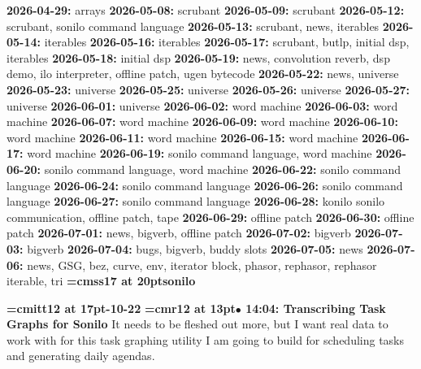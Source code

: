 {\noindent \bf 2026-04-29:} arrays\smallskip
{\noindent \bf 2026-05-08:} scrubant\smallskip
{\noindent \bf 2026-05-09:} scrubant\smallskip
{\noindent \bf 2026-05-12:} scrubant, sonilo command language\smallskip
{\noindent \bf 2026-05-13:} scrubant, news, iterables\smallskip
{\noindent \bf 2026-05-14:} iterables\smallskip
{\noindent \bf 2026-05-16:} iterables\smallskip
{\noindent \bf 2026-05-17:} scrubant, butlp, initial dsp, iterables\smallskip
{\noindent \bf 2026-05-18:} initial dsp\smallskip
{\noindent \bf 2026-05-19:} news, convolution reverb, dsp demo, ilo interpreter, offline patch, ugen bytecode\smallskip
{\noindent \bf 2026-05-22:} news, universe\smallskip
{\noindent \bf 2026-05-23:} universe\smallskip
{\noindent \bf 2026-05-25:} universe\smallskip
{\noindent \bf 2026-05-26:} universe\smallskip
{\noindent \bf 2026-05-27:} universe\smallskip
{\noindent \bf 2026-06-01:} universe\smallskip
{\noindent \bf 2026-06-02:} word machine\smallskip
{\noindent \bf 2026-06-03:} word machine\smallskip
{\noindent \bf 2026-06-07:} word machine\smallskip
{\noindent \bf 2026-06-09:} word machine\smallskip
{\noindent \bf 2026-06-10:} word machine\smallskip
{\noindent \bf 2026-06-11:} word machine\smallskip
{\noindent \bf 2026-06-15:} word machine\smallskip
{\noindent \bf 2026-06-17:} word machine\smallskip
{\noindent \bf 2026-06-19:} sonilo command language, word machine\smallskip
{\noindent \bf 2026-06-20:} sonilo command language, word machine\smallskip
{\noindent \bf 2026-06-22:} sonilo command language\smallskip
{\noindent \bf 2026-06-24:} sonilo command language\smallskip
{\noindent \bf 2026-06-26:} sonilo command language\smallskip
{\noindent \bf 2026-06-27:} sonilo command language\smallskip
{\noindent \bf 2026-06-28:} konilo sonilo communication, offline patch, tape\smallskip
{\noindent \bf 2026-06-29:} offline patch\smallskip
{\noindent \bf 2026-06-30:} offline patch\smallskip
{\noindent \bf 2026-07-01:} news, bigverb, offline patch\smallskip
{\noindent \bf 2026-07-02:} bigverb\smallskip
{\noindent \bf 2026-07-03:} bigverb\smallskip
{\noindent \bf 2026-07-04:} bugs, bigverb, buddy slots\smallskip
{\noindent \bf 2026-07-05:} news\smallskip
{\noindent \bf 2026-07-06:} news, GSG, bez, curve, env, iterator block, phasor, rephasor, rephasor iterable, tri\smallskip
\vfill \break
{}
{\medskip\noindent\bf\font\titlefont=cmss17 at 20pt\titlefont sonilo}\medskip

{\medskip\noindent\bf\font\titlefont=cmitt12 at 17pt-10-22}\medskip
{\smallskip\noindent\bf\font\titlefont=cmr12 at 13pt\titlefont $\bullet$ 14:04: Transcribing Task Graphs for Sonilo}\smallskip
It needs to be fleshed out more, but I want real data to work with for this task graphing utility I am going to build for scheduling tasks and generating daily agendas.
\par


